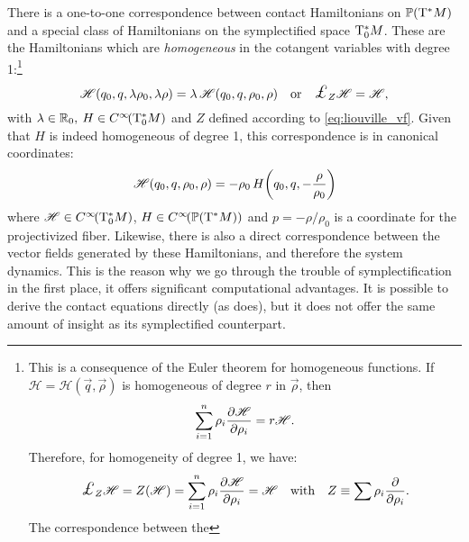 There is a one-to-one correspondence between contact Hamiltonians on $\mathbb{P}\qty(\mathrm{T}^*M)$ and a special class of Hamiltonians on the symplectified space $\mathrm{T}^*_0M$. These are the Hamiltonians which are \emph{homogeneous} in the cotangent variables with degree 1:\footnote
{This is a consequence of the Euler theorem for homogeneous functions. If $\mathscr{H} = \mathscr{H}(\vec{q}, \vec{\rho})$ is homogeneous of degree $r$ in $\vec{\rho}$, then
    $$ \sum_{i = 1}^n \rho_i \pdv{\mathscr{H}}{\rho_i} = r \mathscr{H}. $$
 Therefore, for homogeneity of degree 1, we have: 
 $$ \lied{Z}{\mathscr{H}} = Z(\mathscr{H}) = \sum_{i=1}^n \rho_i \pdv{\mathscr{H}}{\rho_i} = \mathscr{H} \quad \text{with}\quad Z \equiv \sum \rho_i \pdv{}{\rho_i}. $$
 The correspondence between the 
}
\begin{equation}
    \mathscr{H}(q_0, q, \lambda \rho_0, \lambda \rho) = \lambda\,\mathscr{H}(q_0, q, \rho_0, \rho) \quad \text{or} \quad \lied{Z}{\mathscr{H}} = \mathscr{H},
\end{equation}
with $\lambda \in \mathbb{R}_0,\: H \in C^\infty\!\qty(\mathrm{T}^*_0M)$ and $Z$ defined according to \cref{eq:liouville_vf}. Given that $H$ is indeed homogeneous of degree 1, this correspondence is in canonical coordinates:
\begin{equation}
    \mathscr{H}(q_0, q, \rho_0, \rho) = -\rho_0\,H\qty(q_0, q, -\frac{\rho}{\rho_0})
    \label{eq:H_correspondence}
\end{equation}
where $\mathscr{H} \in C^\infty\!\qty(\mathrm{T}^*_0M)$, $H \in C^\infty\!\qty(\mathbb{P}\qty(\mathrm{T}^*M))$ and $p = -\rho / \rho_0$ is a coordinate for the projectivized fiber. Likewise, there is also a direct correspondence between the vector fields generated by these Hamiltonians, and therefore the system dynamics. This is the reason why we go through the trouble of symplectification in the first place, it offers significant computational advantages. It is possible to derive the contact equations directly (as \citet{Bravetti2017} does), but it does not offer the same amount of insight as its symplectified counterpart. \cite{VanderSchaft2021a,Arnold1989}

